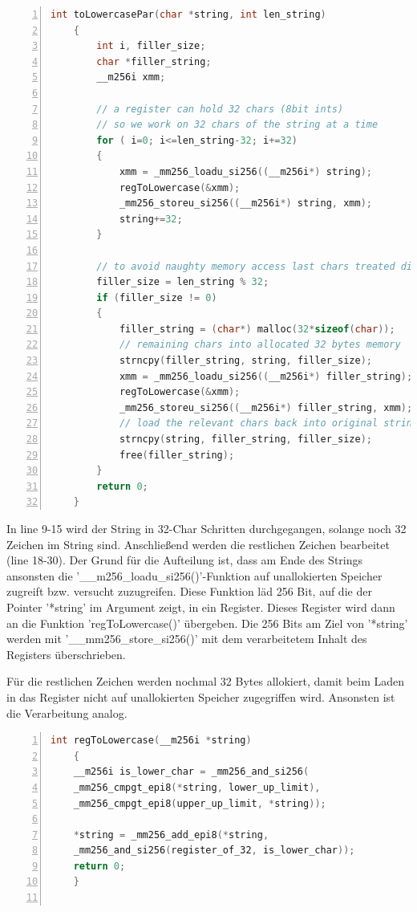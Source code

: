 \documentclass[plainarticle,zihtitle,german,final,hyperref,utf8]{zihpub}
\begin{document}
\begin{lstlisting}[language=c, numbers=left]
	int toLowercasePar(char *string, int len_string)
	{
		int i, filler_size;
		char *filler_string;
		__m256i xmm;
		
		// a register can hold 32 chars (8bit ints)
		// so we work on 32 chars of the string at a time
		for ( i=0; i<=len_string-32; i+=32)
		{
			xmm = _mm256_loadu_si256((__m256i*) string);
			regToLowercase(&xmm);
			_mm256_storeu_si256((__m256i*) string, xmm);
			string+=32;
		}
		
		// to avoid naughty memory access last chars treated different
		filler_size = len_string % 32;
		if (filler_size != 0)
		{
			filler_string = (char*) malloc(32*sizeof(char));
			// remaining chars into allocated 32 bytes memory
			strncpy(filler_string, string, filler_size);
			xmm = _mm256_loadu_si256((__m256i*) filler_string);
			regToLowercase(&xmm);
			_mm256_storeu_si256((__m256i*) filler_string, xmm);	
			// load the relevant chars back into original string
			strncpy(string, filler_string, filler_size);
			free(filler_string);
		}
		return 0;
	}
\end{lstlisting}

In line 9-15 wird der String in 32-Char Schritten durchgegangen, solange noch 32 Zeichen im String sind.
Anschließend werden die restlichen Zeichen bearbeitet (line 18-30). Der Grund für die Aufteilung ist, dass am Ende des Strings ansonsten die '\_\_m256\_loadu\_si256()'-Funktion auf unallokierten Speicher zugreift bzw. versucht zuzugreifen. Diese Funktion läd 256 Bit, auf die der Pointer '{*}string' im Argument zeigt, in ein Register.
Dieses Register wird dann an die Funktion 'regToLowercase()' übergeben. Die 256 Bits am Ziel von '{*}string' werden mit '\_\_mm256\_store\_si256()' mit dem verarbeitetem Inhalt des Registers überschrieben.

Für die restlichen Zeichen werden nochmal 32 Bytes allokiert, damit beim Laden in das Register nicht auf unallokierten Speicher zugegriffen wird. Ansonsten ist die Verarbeitung analog.

\begin{lstlisting}[language=c, numbers=left]
	int regToLowercase(__m256i *string)
	{
	__m256i is_lower_char = _mm256_and_si256(
	_mm256_cmpgt_epi8(*string, lower_up_limit),
	_mm256_cmpgt_epi8(upper_up_limit, *string));

	*string = _mm256_add_epi8(*string,
	_mm256_and_si256(register_of_32, is_lower_char));
	return 0;
	}
	
\end{lstlisting}
\end{document}
